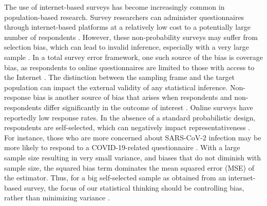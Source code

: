\documentclass{article}
\begin{document}
The use of internet-based surveys has become increasingly common in population-based research. Survey researchers can administer questionnaires through internet-based platforms at a relatively low cost to a potentially large number of respondents \citep{Keiding2016}. However, these non-probability surveys may suffer from selection bias, which can lead to invalid inference, especially with a very large sample \citep{Bethlehem2010}. In a total survey error framework, one such source of the bias is coverage bias, as respondents to online questionnaires are limited to those with access to the Internet \citep{Matthias2009}. The distinction between the sampling frame and the target population can impact the external validity of any statistical inference. Non-response bias is another source of bias that arises when respondents and non-respondents differ significantly in the outcome of interest \citep{Groves2010}. Online surveys have reportedly low response rates. In the absence of a standard probabilistic design, respondents are self-selected, which can negatively impact representativeness \citep{Keiding2016}. For instance, those who are more concerned about SARS-CoV-2 infection may be more likely to respond to a COVID-19-related questionnaire \citep{Nguyen2022-ss}. With a large sample size resulting in very small variance, and biases that do not diminish with sample size, the squared bias term dominates the mean squared error (MSE) of the estimator. Thus, for a big self-selected sample as obtained from an internet-based survey, the focus of our statistical thinking should be controlling bias, rather than minimizing variance \citep{Meng2018}.
\\
\\
\end{document}
